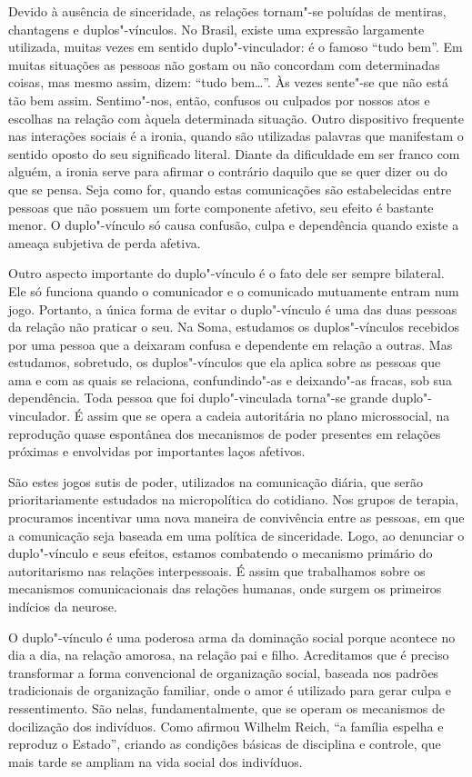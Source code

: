 Devido à ausência de sinceridade, as relações tornam"-se poluídas de
mentiras, chantagens e duplos"-vínculos. No Brasil, existe uma expressão
largamente utilizada, muitas vezes em sentido duplo"-vinculador: é o
famoso ``tudo bem''. Em muitas situações as pessoas não gostam ou não
concordam com determinadas coisas, mas mesmo assim, dizem: ``tudo
bem\ldots{}''. Às vezes sente"-se que não está tão bem assim. Sentimo"-nos,
então, confusos ou culpados por nossos atos e escolhas na relação com
àquela determinada situação. Outro dispositivo frequente nas interações
sociais é a ironia, quando são utilizadas palavras que manifestam o
sentido oposto do seu significado literal. Diante da dificuldade em ser
franco com alguém, a ironia serve para afirmar o contrário daquilo que
se quer dizer ou do que se pensa. Seja como for, quando estas
comunicações são estabelecidas entre pessoas que não possuem um forte
componente afetivo, seu efeito é bastante menor. O duplo"-vínculo só
causa confusão, culpa e dependência quando existe a ameaça subjetiva de
perda afetiva.

Outro aspecto importante do duplo"-vínculo é o fato dele ser sempre
bilateral. Ele só funciona quando o comunicador e o comunicado
mutuamente entram num jogo. Portanto, a única forma de evitar o
duplo"-vínculo é uma das duas pessoas da relação não praticar o seu. Na
Soma, estudamos os duplos"-vínculos recebidos por uma pessoa que a
deixaram confusa e dependente em relação a outras. Mas estudamos,
sobretudo, os duplos"-vínculos que ela aplica sobre as pessoas que ama e
com as quais se relaciona, confundindo"-as e deixando"-as fracas, sob sua
dependência. Toda pessoa que foi duplo"-vinculada torna"-se grande
duplo"-vinculador. É assim que se opera a cadeia autoritária no plano
microssocial, na reprodução quase espontânea dos mecanismos de poder
presentes em relações próximas e envolvidas por importantes laços
afetivos.

São estes jogos sutis de poder, utilizados na comunicação diária, que
serão prioritariamente estudados na micropolítica do cotidiano. Nos
grupos de terapia, procuramos incentivar uma nova maneira de convivência
entre as pessoas, em que a comunicação seja baseada em uma política de
sinceridade. Logo, ao denunciar o duplo"-vínculo e seus efeitos, estamos
combatendo o mecanismo primário do autoritarismo nas relações
interpessoais. É assim que trabalhamos sobre os mecanismos
comunicacionais das relações humanas, onde surgem os primeiros indícios
da neurose.

O duplo"-vínculo é uma poderosa arma da dominação social porque acontece
no dia a dia, na relação amorosa, na relação pai e filho. Acreditamos
que é preciso transformar a forma convencional de organização social,
baseada nos padrões tradicionais de organização familiar, onde o amor é
utilizado para gerar culpa e ressentimento. São nelas, fundamentalmente,
que se operam os mecanismos de docilização dos indivíduos. Como afirmou
Wilhelm Reich, ``a família espelha e reproduz o Estado'', criando as
condições básicas de disciplina e controle, que mais tarde se ampliam na
vida social dos indivíduos.

